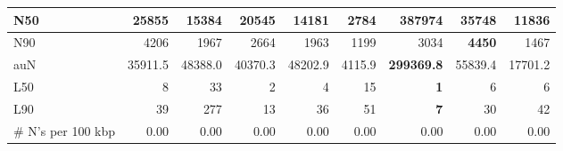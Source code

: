 \documentclass[12pt,a4paper]{article}
\begin{document}
\begin{table}[ht]
\begin{center}
\begin{tabular}{|l*{8}{|r}|}
N50 & 25855 & 15384 & 20545 & 14181 & 2784 & {\bf 387974} & 35748 & 11836 \\ \hline
N90 & 4206 & 1967 & 2664 & 1963 & 1199 & 3034 & {\bf 4450} & 1467 \\ \hline
auN & 35911.5 & 48388.0 & 40370.3 & 48202.9 & 4115.9 & {\bf 299369.8} & 55839.4 & 17701.2 \\ \hline
L50 & 8 & 33 & 2 & 4 & 15 & {\bf 1} & 6 & 6 \\ \hline
L90 & 39 & 277 & 13 & 36 & 51 & {\bf 7} & 30 & 42 \\ \hline
\# N's per 100 kbp & 0.00 & 0.00 & 0.00 & 0.00 & 0.00 & 0.00 & 0.00 & 0.00 \\ \hline
\end{tabular}
\end{center}
\end{table}
\end{document}
